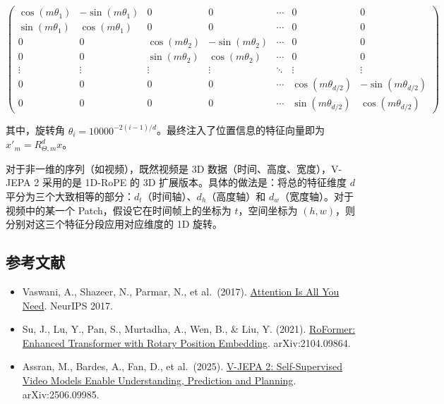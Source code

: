 \[
\begin{pmatrix}
\cos(m\theta_1) & -\sin(m\theta_1) & 0 & 0 & \cdots & 0 & 0 \\
\sin(m\theta_1) & \cos(m\theta_1) & 0 & 0 & \cdots & 0 & 0 \\
0 & 0 & \cos(m\theta_2) & -\sin(m\theta_2) & \cdots & 0 & 0 \\
0 & 0 & \sin(m\theta_2) & \cos(m\theta_2) & \cdots & 0 & 0 \\
\vdots & \vdots & \vdots & \vdots & \ddots & \vdots & \vdots \\
0 & 0 & 0 & 0 & \cdots & \cos(m\theta_{d/2}) & -\sin(m\theta_{d/2}) \\
0 & 0 & 0 & 0 & \cdots & \sin(m\theta_{d/2}) & \cos(m\theta_{d/2})
\end{pmatrix}
\]

其中，旋转角 \(\theta_i=10000^{-2(i-1)/d}\)。最终注入了位置信息的特征向量即为 \(x'_m=R_{\Theta,m}^{d}x\)。

对于非一维的序列（如视频），既然视频是 3D 数据（时间、高度、宽度），V-JEPA 2 采用的是 1D-RoPE 的 3D 扩展版本。具体的做法是：将总的特征维度 \(d\) 平分为三个大致相等的部分：\(d_t\)（时间轴）、\(d_h\)（高度轴）和 \(d_w\)（宽度轴）。对于视频中的某一个 Patch，假设它在时间帧上的坐标为 \(t\)，空间坐标为 \((h,w)\)，则分别对这三个特征分段应用对应维度的 1D 旋转。

\FloatBarrier
{}
\hypertarget{ux53c2ux8003ux6587ux732e-70}{%
\subsection{参考文献}\label{ux53c2ux8003ux6587ux732e-70}}

\vspace{0.25em}
\begin{itemize}
\tightlist
\item
  Vaswani, A., Shazeer, N., Parmar, N., et al.~(2017). \href{https://arxiv.org/abs/1706.03762}{Attention Is All You Need}. NeurIPS 2017.
\item
  Su, J., Lu, Y., Pan, S., Murtadha, A., Wen, B., \& Liu, Y. (2021). \href{https://arxiv.org/abs/2104.09864}{RoFormer: Enhanced Transformer with Rotary Position Embedding}. arXiv:2104.09864.
\item
  Assran, M., Bardes, A., Fan, D., et al.~(2025). \href{https://arxiv.org/abs/2506.09985}{V-JEPA 2: Self-Supervised Video Models Enable Understanding, Prediction and Planning}. arXiv:2506.09985.
\end{itemize}

\clearpage
